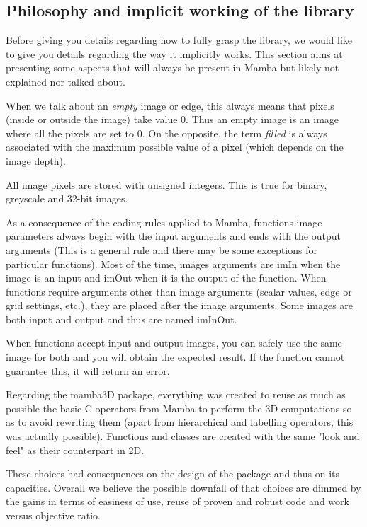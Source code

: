 \documentclass[a4paper,10pt,oneside]{article}
\begin{document}
\subsection{Philosophy and implicit working of the library}

Before giving you details regarding how to fully grasp the library, we would
like to give you details regarding the way it implicitly works. This section aims
at presenting some aspects that will always be present in Mamba but likely not 
explained nor talked about.

When we talk about an \textit{empty} image or edge, this always means that pixels 
(inside or outside the image) take value 0. Thus an empty
image is an image where all the pixels are set to 0. On the opposite, the term 
\textit{filled} is always associated with the maximum possible value of a pixel (which
depends on the image depth).

All image pixels are stored with unsigned integers. This is true for binary,
greyscale and 32-bit images.

As a consequence of the coding rules applied to Mamba, functions image parameters
always begin with the input arguments and ends with the output arguments (This 
is a general rule and there may be some exceptions for particular functions).
Most of the time, images arguments are imIn when the image is an input and imOut
when it is the output of the function. When functions require arguments other than 
image arguments (scalar values, edge or grid settings, etc.), they are placed after 
the image arguments. Some images are both input and output and thus are named
imInOut.

When functions accept input and output images, you can safely use the same image
for both and you will obtain the expected result. If the function cannot 
guarantee this, it will return an error.

Regarding the mamba3D package, everything was created to reuse as much as
possible the basic C operators from Mamba to perform the 3D computations so
as to avoid rewriting them (apart from hierarchical and labelling operators,
this was actually possible). Functions and classes are created with the same
"look and feel" as their counterpart in 2D.

These choices had consequences on the design of the package and thus on its
capacities. Overall we believe the possible downfall of that choices are
dimmed by the gains in terms of easiness of use, reuse of proven and robust
code and work versus objective ratio.
\end{document}

